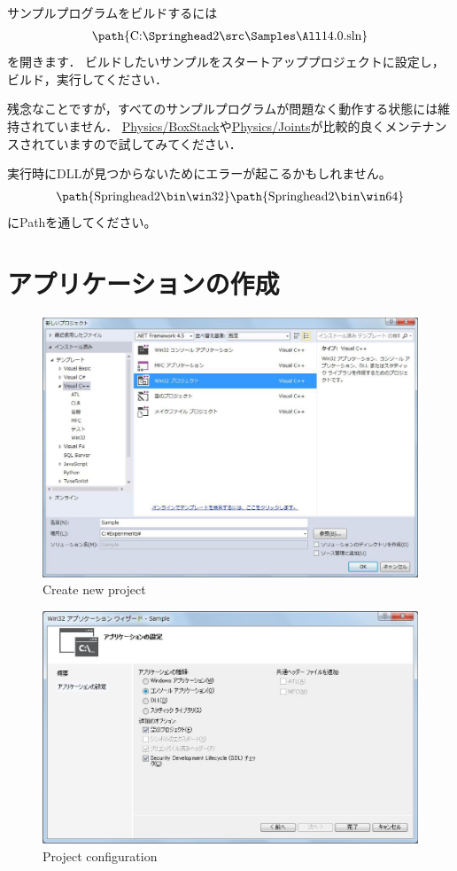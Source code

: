 \KLUDGE サンプルプログラムをビルドするには
\begin{align*}
\text{\path{C:\Springhead2\src\Samples\All14.0.sln}}
\end{align*}
\KLUDGE を開きます．
\KLUDGE ビルドしたいサンプルをスタートアッププロジェクトに設定し，ビルド，実行してください．

\KLUDGE 残念なことですが，すべてのサンプルプログラムが問題なく動作する状態には維持されていません．
\url{Physics/BoxStack}や\url{Physics/Joints}が比較的良くメンテナンスされていますので試してみてください．

\KLUDGE 実行時にDLLが見つからないためにエラーが起こるかもしれません。
\begin{align*}
\text{\path{Springhead2\bin\win32}}
\text{\path{Springhead2\bin\win64}}
\end{align*}
\KLUDGE にPathを通してください。

\section{アプリケーションの作成}
\label{sec_create_application}

\begin{figure}[t]
\begin{center}
\includegraphics[width=.6\hsize]{fig/newproject1.eps}
\end{center}
\caption{Create new project}
\label{fig_newproject1}
\end{figure}

\begin{figure}[t]
\begin{center}
\includegraphics[width=.6\hsize]{fig/newproject2.eps}
\end{center}
\caption{Project configuration}
\label{fig_newproject2}
\end{figure}

